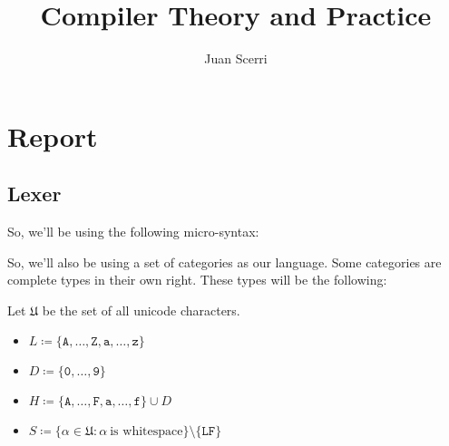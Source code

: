 \documentclass[article]{uom-coursework}
\title{Compiler Theory and Practice}
\author{Juan Scerri}
\begin{document}

\pagestyle{umpage}

\frontmatter

\maketitle %

\tableofcontents %

\clearpage

\lstlistoflistings

\clearpage

\mainmatter

\chapter*{Report}
\label{chap:report}

\section{Lexer}



So, we'll be using the following micro-syntax:

So, we'll also be using a set of categories as our
language. Some categories are complete types
in their own right. These types will be the following:

Let $\mathfrak{U}$ be the set of all unicode characters.

\begin{itemize}
    \item $L \coloneq \{
        \texttt{A},\ldots,\texttt{Z},\texttt{a},\ldots,\texttt{z}\}$
    \item $D \coloneq \{\texttt{0},\ldots,\texttt{9}\}$
    \item $H \coloneq \{\texttt{A},\ldots,\texttt{F},\texttt{a},\ldots,\texttt{f}\} \cup D$
    \item $S \coloneq \{\alpha \in \mathfrak{U} \colon \alpha\ \text{is whitespace}\}\setminus\{\texttt{LF}\}$
\end{itemize}
\end{document}
